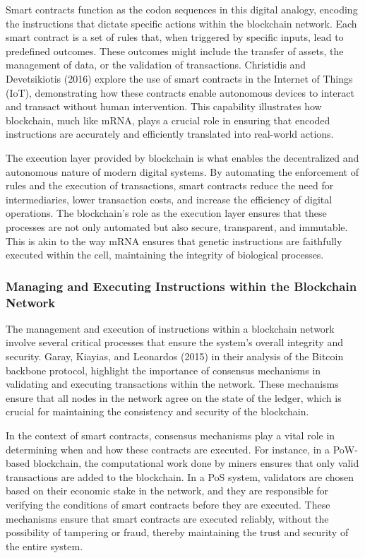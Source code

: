 \documentclass[12pt,twoside]{article}
\begin{document}
Smart contracts function as the codon sequences in this digital analogy, encoding the instructions that dictate specific actions within the blockchain network. Each smart contract is a set of rules that, when triggered by specific inputs, lead to predefined outcomes. These outcomes might include the transfer of assets, the management of data, or the validation of transactions. Christidis and Devetsikiotis (2016) explore the use of smart contracts in the Internet of Things (IoT), demonstrating how these contracts enable autonomous devices to interact and transact without human intervention. This capability illustrates how blockchain, much like mRNA, plays a crucial role in ensuring that encoded instructions are accurately and efficiently translated into real-world actions.

The execution layer provided by blockchain is what enables the decentralized and autonomous nature of modern digital systems. By automating the enforcement of rules and the execution of transactions, smart contracts reduce the need for intermediaries, lower transaction costs, and increase the efficiency of digital operations. The blockchain’s role as the execution layer ensures that these processes are not only automated but also secure, transparent, and immutable. This is akin to the way mRNA ensures that genetic instructions are faithfully executed within the cell, maintaining the integrity of biological processes.

\subsubsection{Managing and Executing Instructions within the Blockchain Network}

The management and execution of instructions within a blockchain network involve several critical processes that ensure the system’s overall integrity and security. Garay, Kiayias, and Leonardos (2015) in their analysis of the Bitcoin backbone protocol, highlight the importance of consensus mechanisms in validating and executing transactions within the network. These mechanisms ensure that all nodes in the network agree on the state of the ledger, which is crucial for maintaining the consistency and security of the blockchain.

In the context of smart contracts, consensus mechanisms play a vital role in determining when and how these contracts are executed. For instance, in a PoW-based blockchain, the computational work done by miners ensures that only valid transactions are added to the blockchain. In a PoS system, validators are chosen based on their economic stake in the network, and they are responsible for verifying the conditions of smart contracts before they are executed. These mechanisms ensure that smart contracts are executed reliably, without the possibility of tampering or fraud, thereby maintaining the trust and security of the entire system.
\end{document}
